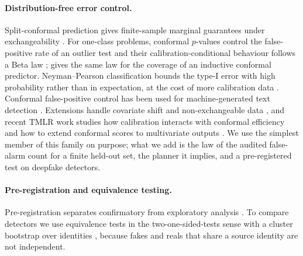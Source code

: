 \paragraph{Distribution-free error control.}
Split-conformal prediction gives finite-sample marginal guarantees under exchangeability \citep{vovk2012conditional,lei2018distribution,angelopoulos2023gentle}. For one-class problems, conformal $p$-values control the false-positive rate of an outlier test and their calibration-conditional behaviour follows a Beta law \citep{bates2023testing}; \citet{vovk2012conditional} gives the same law for the coverage of an inductive conformal predictor. Neyman--Pearson classification bounds the type-I error with high probability rather than in expectation, at the cost of more calibration data \citep{tong2018neyman}. Conformal false-positive control has been used for machine-generated text detection \citep{zhu2025reliably}. Extensions handle covariate shift and non-exchangeable data \citep{tibshirani2019conformal,barber2023beyond}, and recent TMLR work studies how calibration interacts with conformal efficiency \citep{xi2025confidence} and how to extend conformal scores to multivariate outputs \citep{klein2026multivariate}. We use the simplest member of this family on purpose; what we add is the law of the audited false-alarm count for a finite held-out set, the planner it implies, and a pre-registered test on deepfake detectors.

\paragraph{Pre-registration and equivalence testing.}
Pre-registration separates confirmatory from exploratory analysis \citep{nosek2018preregistration}. To compare detectors we use equivalence tests in the two-one-sided-tests sense \citep{schuirmann1987comparison} with a cluster bootstrap over identities \citep{field2007bootstrapping}, because fakes and reals that share a source identity are not independent.

